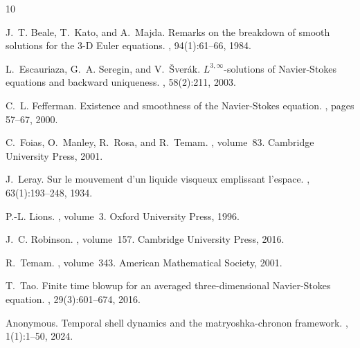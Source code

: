\documentclass[11pt,a4paper]{article}
\theoremstyle{definition}
\begin{document}

\begin{thebibliography}{10}

J.~T. Beale, T.~Kato, and A.~Majda.
\newblock Remarks on the breakdown of smooth solutions for the {3-D Euler} equations.
, 94(1):61--66, 1984.

L.~Escauriaza, G.~A. Seregin, and V.~{\v{S}}ver{\'a}k.
\newblock ${L}^{3,\infty}$-solutions of {Navier-Stokes} equations and backward uniqueness.
, 58(2):211, 2003.

C.~L. Fefferman.
\newblock Existence and smoothness of the {Navier-Stokes} equation.
, pages 57--67, 2000.

C.~Foias, O.~Manley, R.~Rosa, and R.~Temam.
, volume~83.
\newblock Cambridge University Press, 2001.

J.~Leray.
\newblock Sur le mouvement d'un liquide visqueux emplissant l'espace.
, 63(1):193--248, 1934.

P.-L. Lions.
, volume~3.
\newblock Oxford University Press, 1996.

J.~C. Robinson.
, volume~157.
\newblock Cambridge University Press, 2016.

R.~Temam.
, volume~343.
\newblock American Mathematical Society, 2001.

T.~Tao.
\newblock Finite time blowup for an averaged three-dimensional {Navier-Stokes} equation.
, 29(3):601--674, 2016.

Anonymous.
\newblock Temporal shell dynamics and the matryoshka-chronon framework.
, 1(1):1--50, 2024.

\end{thebibliography}
\end{document}
